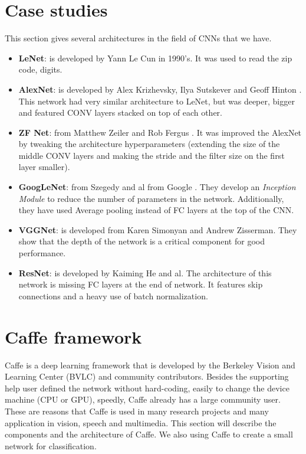 \section{Case studies}
This section gives several architectures in the field of CNNs that we have.
\begin{itemize}
	\item \textbf{LeNet}: is developed by Yann Le Cun \cite{lecun1998gradient} in 1990's. It was used to read the zip code, digits.
	\item \textbf{AlexNet}: is developed by Alex Krizhevsky, Ilya Sutskever and Geoff Hinton \cite{krizhevsky2012imagenet}. This network had very similar architecture to LeNet, but was deeper, bigger and featured CONV layers stacked on top of each other.
	\item \textbf{ZF Net}: from Matthew Zeiler and Rob Fergus \cite{zeiler2014visualizing}. It was improved the AlexNet by tweaking the architecture hyperparameters (extending the size of the middle CONV layers and making the stride and the filter size on the first layer smaller).
	\item \textbf{GoogLeNet}: from Szegedy and al from Google \cite{szegedy2015going}. They develop an \textit{Inception Module} to reduce the number of parameters in the network. Additionally, they have used Average pooling instead of FC layers at the top of the CNN.
	\item \textbf{VGGNet}: is developed from Karen Simonyan and Andrew Zisserman\cite{simonyan2014very}. They show that the depth of the network is a critical component for good performance.
	\item \textbf{ResNet}: is developed by Kaiming He and al\cite{he2015deep}. The architecture of this network is missing FC layers at the end of network. It features skip connections and a heavy use of batch normalization\cite{ioffe2015batch}.
\end{itemize}

\iffalse
\section{Caffe framework}
Caffe is a deep learning framework that is developed by the Berkeley Vision and Learning Center (BVLC) and community contributors. Besides the supporting help user defined the network without hard-coding, easily to change the device machine (CPU or GPU), speedly, Caffe already has a large community user. These are reasons that Caffe is used in many research projects and many application in vision, speech and multimedia. This  section will describe the components and the architecture of Caffe. We also using Caffe to create a small network for classification.
